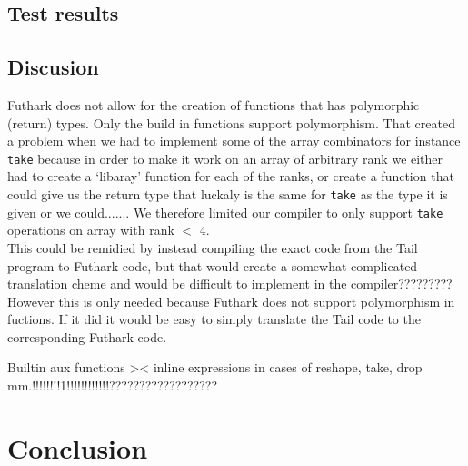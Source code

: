 \documentclass[11pt]{article}
\begin{document}
\subsection{Test results}
\subsection{Discusion}
Futhark does not allow for the creation of functions that has polymorphic (return) types. Only the build in functions support polymorphism. That created a problem when we had to implement some of the array combinators for instance  \verb|take| because in order to make it work on an array of arbitrary rank we either had to create a `libaray' function for each of the ranks, or create a function that could give us the return type that luckaly is the same for \verb|take| as the type it is given or we could....... 
We therefore limited our compiler to only support \verb|take| operations on array with rank \(< \) 4. \\ %

This could be remidied by instead compiling the exact code from the Tail program to Futhark code, but that would create a somewhat complicated translation cheme and would be difficult to implement in the compiler????????? %
However this is only needed because Futhark does not support polymorphism in fuctions. If it did it would be easy to simply translate the Tail code to the corresponding Futhark code.

Builtin aux functions >< inline expressions in cases of reshape, take, drop mm.!!!!!!!!1!!!!!!!!!!!!??????????????????

\section{Conclusion}



\end{document}
